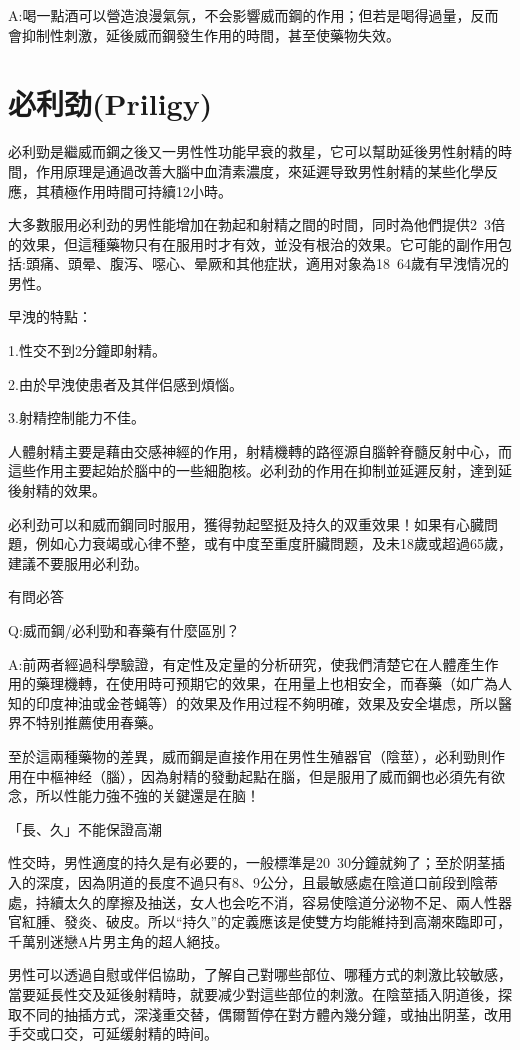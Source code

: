 \documentclass[12pt,UTF8]{ctexbook}
\begin{document}
A:喝一點酒可以營造浪漫氣氛，不会影響威而鋼的作用；但若是喝得過量，反而會抑制性刺激，延後威而鋼發生作用的時間，甚至使藥物失效。

\section{必利劲(Priligy)}

必利勁是繼威而鋼之後又一男性性功能早衰的救星，它可以幫助延後男性射精的時間，作用原理是通過改善大腦中血清素濃度，來延遲导致男性射精的某些化學反應，其積極作用時間可持續12小時。

大多數服用必利劲的男性能增加在勃起和射精之間的时間，同时為他們提供2~3倍的效果，但這種藥物只有在服用时才有效，並没有根治的效果。它可能的副作用包括:頭痛、頭晕、腹泻、噁心、晕厥和其他症狀，適用对象為18~64歲有早洩情况的男性。

早洩的特點：

1.性交不到2分鐘即射精。

2.由於早洩使患者及其伴侣感到煩惱。

3.射精控制能力不佳。

人體射精主要是藉由交感神經的作用，射精機轉的路徑源自腦幹脊髓反射中心，而這些作用主要起始於腦中的一些細胞核。必利劲的作用在抑制並延遲反射，達到延後射精的效果。

必利劲可以和威而鋼同时服用，獲得勃起堅挺及持久的双重效果！如果有心臓問題，例如心力衰竭或心律不整，或有中度至重度肝臟問题，及未18歲或超過65歲，建議不要服用必利劲。

有問必答

Q:威而鋼/必利勁和春藥有什麼區別？

A:前两者經過科學驗證，有定性及定量的分析研究，使我們清楚它在人體產生作用的藥理機轉，在使用時可预期它的效果，在用量上也相安全，而春藥（如广為人知的印度神油或金苍蝇等）的效果及作用过程不夠明確，效果及安全堪虑，所以醫界不特别推薦使用春藥。

至於這兩種藥物的差異，威而鋼是直接作用在男性生殖器官（陰莖），必利勁則作用在中樞神经（腦），因為射精的發動起點在腦，但是服用了威而鋼也必須先有欲念，所以性能力強不強的关鍵還是在脑！

「長、久」不能保證高潮

性交時，男性適度的持久是有必要的，一般標準是20~30分鐘就夠了；至於阴茎插入的深度，因為阴道的長度不過只有8、9公分，且最敏感處在陰道口前段到陰蒂處，持續太久的摩擦及抽送，女人也会吃不消，容易使陰道分泌物不足、兩人性器官紅腫、發炎、破皮。所以“持久”的定義應该是使雙方均能維持到高潮來臨即可，千萬别迷戀A片男主角的超人絕技。

男性可以透過自慰或伴侣協助，了解自己對哪些部位、哪種方式的刺激比较敏感，當要延長性交及延後射精時，就要减少對這些部位的刺激。在陰莖插入阴道後，探取不同的抽插方式，深淺重交替，偶爾暂停在對方體內幾分鐘，或抽出阴茎，改用手交或口交，可延缓射精的時间。
\end{document}
